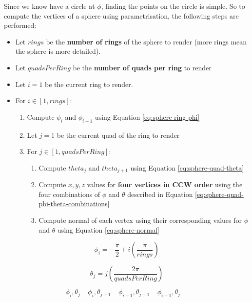 \documentclass{article}
\begin{document}
Since we know have a circle at $\phi$, finding the points on the circle is simple. So to compute the vertices of a sphere using parametrisation, the following steps are performed:
\begin{itemize}
	\item Let $rings$ be the \textbf{number of rings} of the sphere to render (more rings mean the sphere is more detailed).
	\item Let $quadsPerRing$ be the \textbf{number of quads per ring} to render
	\item Let $i = 1$ be the current ring to render.
	\item For $i \in [1,rings]$:
	\begin{enumerate}
		\item Compute $\phi_i$ and $\phi_{i+1}$ using Equation \ref{eq:sphere-ring-phi}
		\item Let $j = 1$ be the current quad of the ring to render
		\item For $j \in [1,quadsPerRing]$:
		\begin{enumerate}
			\item Compute $theta_j$ and $theta_{j+1}$ using Equation \ref{eq:sphere-quad-theta}
			\item Compute $x,y,z$ values for \textbf{four vertices in CCW order} using the four combinations of $\phi$ and $\theta$ described in Equation \ref{eq:sphere-quad-phi-theta-combinations}
			\item Compute normal of each vertex using their corresponding values for $\phi$ and $\theta$ using Equation \ref{eq:sphere-normal}
		\end{enumerate}
	\end{enumerate}
\end{itemize}

\begin{equation}
	\phi_i = -\frac{\pi}{2} + i \left( \frac{\pi}{rings} \right)
	\label{eq:sphere-ring-phi}
\end{equation}

\begin{equation}
	\theta_j = j \left( \frac{2 \pi}{quadsPerRing} \right)
	\label{eq:sphere-quad-theta}
\end{equation}

\begin{equation}
	\phi_i,\theta_j \;\;\;\;
	\phi_i,\theta_{j+1} \;\;\;\;
	\phi_{i+1},\theta_{j+1} \;\;\;\;
	\phi_{i+1},\theta_j \;\;\;\;	
	\label{eq:sphere-quad-phi-theta-combinations}
\end{equation}
\end{document}
